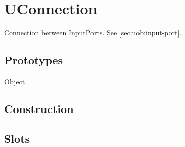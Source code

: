 
\section{UConnection}

Connection between InputPorts.  See \autoref{sec:uob:input-port}.

\subsection{Prototypes}
\begin{refObjects}
\item[Object]
\end{refObjects}

\subsection{Construction}

\subsection{Slots}

